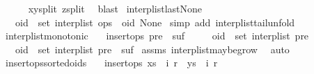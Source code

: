 \begin{isabellebody}
\ \ \ \ \isamarkupfalse%
\ xy{\isacharunderscore}split\ z{\isacharunderscore}split\ \isamarkupfalse%
\ blast\isanewline
{}\isamarkupfalse%
%
\endisatagproof
{\isafoldproof}%
%
\isadelimproof
\isanewline
%
\endisadelimproof
\isanewline
{}\isamarkupfalse%
\ interp{\isacharunderscore}list{\isacharunderscore}last{\isacharunderscore}None{\isacharcolon}\isanewline
\ \ \ {\isachardoublequoteopen}oid\ {\isasymin}\ set\ {\isacharparenleft}interp{\isacharunderscore}list\ {\isacharparenleft}ops\ {\isacharat}\ {\isacharbrackleft}{\isacharparenleft}oid{\isacharcomma}\ None{\isacharparenright}{\isacharbrackright}{\isacharparenright}{\isacharparenright}{\isachardoublequoteclose}\isanewline
%
\isadelimproof
%
\endisadelimproof
%
\isatagproof
{}\isamarkupfalse%
\ {\isacharparenleft}simp\ add{\isacharcolon}\ interp{\isacharunderscore}list{\isacharunderscore}tail{\isacharunderscore}unfold{\isacharparenright}%
\endisatagproof
{\isafoldproof}%
%
\isadelimproof
\isanewline
%
\endisadelimproof
\isanewline
{}\isamarkupfalse%
\ interp{\isacharunderscore}list{\isacharunderscore}monotonic{\isacharcolon}\isanewline
\ \ \ {\isachardoublequoteopen}insert{\isacharunderscore}ops\ {\isacharparenleft}pre\ {\isacharat}\ suf{\isacharparenright}{\isachardoublequoteclose}\isanewline
\ \ \ \ \ {\isachardoublequoteopen}oid\ {\isasymin}\ set\ {\isacharparenleft}interp{\isacharunderscore}list\ pre{\isacharparenright}{\isachardoublequoteclose}\isanewline
\ \ \ {\isachardoublequoteopen}oid\ {\isasymin}\ set\ {\isacharparenleft}interp{\isacharunderscore}list\ {\isacharparenleft}pre\ {\isacharat}\ suf{\isacharparenright}{\isacharparenright}{\isachardoublequoteclose}\isanewline
%
\isadelimproof
%
\endisadelimproof
%
\isatagproof
{}\isamarkupfalse%
\ assms\ interp{\isacharunderscore}list{\isacharunderscore}maybe{\isacharunderscore}grow{}\ \isamarkupfalse%
\ auto%
\endisatagproof
{\isafoldproof}%
%
\isadelimproof
\isanewline
%
\endisadelimproof
\isanewline
{}\isamarkupfalse%
\ insert{\isacharunderscore}ops{\isacharunderscore}sorted{\isacharunderscore}oids{\isacharcolon}\isanewline
\ \ \ {\isachardoublequoteopen}insert{\isacharunderscore}ops\ {\isacharparenleft}xs\ {\isacharat}\ {\isacharbrackleft}{\isacharparenleft}i{}{\isacharcomma}\ r{}{\isacharparenright}{\isacharbrackright}\ {\isacharat}\ ys\ {\isacharat}\ {\isacharbrackleft}{\isacharparenleft}i{}{\isacharcomma}\ r{}{\isacharparenright}{\isacharbrackright}{\isacharparenright}{\isachardoublequoteclose}\isanewline

\end{isabellebody}
